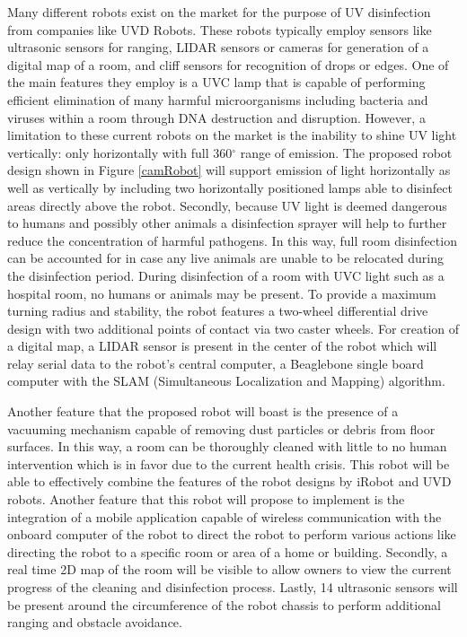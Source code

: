 \documentclass[10pt,a4paper]{article}
\begin{document}
Many different robots exist on the market for the purpose of UV disinfection from companies like UVD Robots. These robots typically employ sensors like ultrasonic sensors for ranging, LIDAR sensors or cameras for generation of a digital map of a room, and cliff sensors for recognition of drops or edges. One of the main features they employ is a UVC lamp that is capable of performing efficient elimination of many harmful microorganisms including bacteria and viruses within a room through DNA destruction and disruption. However, a limitation to these current robots on the market is the inability to shine UV light vertically: only horizontally with full 360$^\circ$ range of emission. The proposed robot design shown in Figure \ref{camRobot} will support emission of light horizontally as well as vertically by including two horizontally positioned lamps able to disinfect areas directly above the robot. Secondly, because UV light is deemed dangerous to humans and possibly other animals a disinfection sprayer will help to further reduce the concentration of harmful pathogens. In this way, full room disinfection can be accounted for in case any live animals are unable to be relocated during the disinfection period. During disinfection of a room with UVC light such as a hospital room, no humans or animals may be present. To provide a maximum turning radius and stability, the robot features a two-wheel differential drive design with two additional points of contact via two caster wheels. For creation of a digital map, a LIDAR sensor is present in the center of the robot which will relay serial data to the robot's central computer, a Beaglebone single board computer with the SLAM (Simultaneous Localization and Mapping) algorithm.

Another feature that the proposed robot will boast is the presence of a vacuuming mechanism capable of removing dust particles or debris from floor surfaces. In this way, a room can be thoroughly cleaned with little to no human intervention which is in favor due to the current health crisis. This robot will be able to effectively combine the features of the robot designs by iRobot and UVD robots. Another feature that this robot will propose to implement is the integration of a mobile application capable of wireless communication with the onboard computer of the robot to direct the robot to perform various actions like directing the robot to a specific room or area of a home or building. Secondly, a real time 2D map of the room will be visible to allow owners to view the current progress of the cleaning and disinfection process. Lastly, 14 ultrasonic sensors will be present around the circumference of the robot chassis to perform additional ranging and obstacle avoidance.
\end{document}
